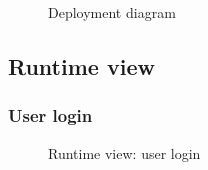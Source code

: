 \begin{figure}[!h]
	\centering
	\caption{Deployment diagram}
\end{figure}
\clearpage

\subsection{Runtime view}
\label{subsec:runtimeView}
\subsubsection{User login}
	\begin{figure}[!h]
		\centering
		\caption{Runtime view: user login}
	\end{figure}
	\clearpage
